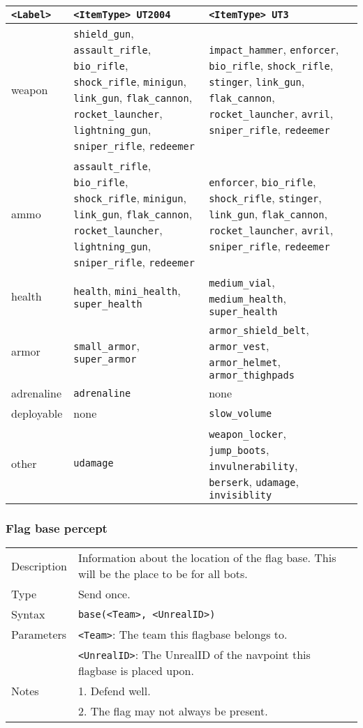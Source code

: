 \documentclass[11pt,a4paper]{article}
\begin{document}
\begin{small}
\begin{tabular}{|p{2cm}|p{6cm}|p{6cm}|p{6cm}|}	
	\hline
\verb|<Label>| & \verb|<ItemType> UT2004| & \verb|<ItemType> UT3|\\
\hline
weapon &
\verb|shield_gun|, \verb|assault_rifle|, \verb|bio_rifle|, \verb|shock_rifle|, \verb|minigun|, \verb|link_gun|, \verb|flak_cannon|, \verb|rocket_launcher|, \verb|lightning_gun|, \verb|sniper_rifle|, \verb|redeemer| &
\verb|impact_hammer|, \verb|enforcer|, \verb|bio_rifle|, \verb|shock_rifle|, \verb|stinger|, \verb|link_gun|, \verb|flak_cannon|, \verb|rocket_launcher|, \verb|avril|, \verb|sniper_rifle|, \verb|redeemer| \\
ammo &
\verb|assault_rifle|, \verb|bio_rifle|, \verb|shock_rifle|, \verb|minigun|, \verb|link_gun|, \verb|flak_cannon|, \verb|rocket_launcher|, \verb|lightning_gun|, \verb|sniper_rifle|, \verb|redeemer| &
\verb|enforcer|, \verb|bio_rifle|, \verb|shock_rifle|, \verb|stinger|, \verb|link_gun|, \verb|flak_cannon|, \verb|rocket_launcher|, \verb|avril|, \verb|sniper_rifle|, \verb|redeemer| \\
health & \verb|health|, \verb|mini_health|, \verb|super_health| & \verb|medium_vial|, \verb|medium_health|, \verb|super_health|\\
armor & \verb|small_armor|, \verb|super_armor| & \verb|armor_shield_belt|, \verb|armor_vest|, \verb|armor_helmet|, \verb|armor_thighpads|\\
adrenaline & \verb|adrenaline| & none\\
deployable & none & \verb|slow_volume|\\
other & \verb|udamage| & \verb|weapon_locker|, \verb|jump_boots|, \verb|invulnerability|, \verb|berserk|, \verb|udamage|, \verb|invisiblity| \\
 \hline
\end{tabular}
\end{small}

\subsubsection*{Flag base percept}
\begin{small}
\begin{tabular}{p{2cm}p{9cm}}
Description & Information about the location of the flag base. This will be the place to be for all bots.\\
Type & Send once.\\
Syntax & \verb|base(<Team>, <UnrealID>)|\\ 
Parameters &
	\verb|<Team>|: The team this flagbase belongs to.\\
&	\verb|<UnrealID>|: The UnrealID of the navpoint this flagbase is placed upon.\\
Notes & 
	1.	Defend well.\\
&	2.	The flag may not always be present.
\end{tabular}
\end{small}
\end{document}
